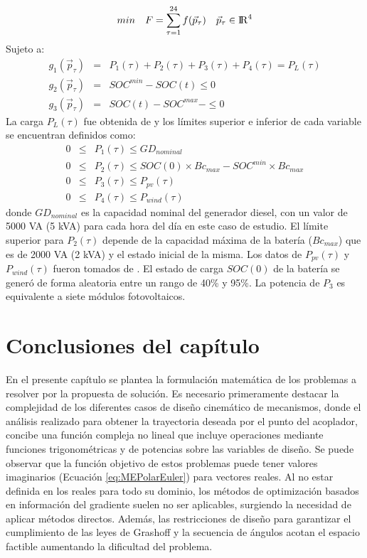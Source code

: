 \begin{equation}\label{eq:MR-FO3}
 min\quad  F=
 \sum_{\tau=1}^{24}f(\vec{p}_\tau) \quad \vec{p}_\tau \in {\rm I\!R}^{4}
 \end{equation}
 Sujeto a:
\begin{eqnarray}\label{eq:Restricciones MR}
g_1(\vec{p}_\tau)&=&P_1(\tau)+P_2(\tau)+P_3(\tau)+P_4(\tau)=P_L(\tau)\\
g_2(\vec{p}_\tau)&=&SOC^{min}-SOC(t)\leq 0 \\
g_3(\vec{p}_\tau)&=&SOC(t)-SOC^{max}-\leq 0 
\end{eqnarray}
La carga $P_L(\tau)$ fue obtenida de \cite{tazvinga2014energy} y los límites superior e inferior de cada variable se encuentran definidos como:
\begin{eqnarray}\label{eq:Restricciones MR3}
0  & \leq & P_1(\tau)   \leq  GD_{nominal} \\
0  & \leq & P_2(\tau)   \leq  SOC(0) \times Bc_{max}-  SOC^{min} \times  Bc_{max}\\
0  & \leq & P_3(\tau)   \leq  P_{pv}( \tau) \\
0  & \leq & P_4(\tau)   \leq  P_{wind}(\tau )  \label{eq:ultima restriccion MR}
\end{eqnarray}
donde $GD_{nominal}$ es la capacidad nominal del generador diesel, con un valor de 5000 VA (5 kVA) para cada hora del día en este caso de estudio. El límite superior para $ P_2(\tau)$ depende de la capacidad máxima de la batería ($Bc_{max}$) que es de 2000 VA (2 kVA) y el estado inicial de la misma. Los datos de $ P_{pv}( \tau)$ y $ P_{wind}(\tau )$  fueron tomados de \cite{Ramabhotla_Economic_dispatch}. El estado de carga $SOC(0)$ de la batería se generó de forma aleatoria entre un rango de 40\% y 95\%. La potencia de $P_3$ es equivalente a siete módulos fotovoltaicos.				
	
						


\section{Conclusiones del capítulo}
En el presente capítulo se plantea la formulación matemática de los problemas a resolver por la propuesta de solución. Es necesario primeramente destacar la complejidad de los diferentes casos de diseño cinemático de mecanismos, donde el análisis realizado para obtener la trayectoria deseada por el punto del acoplador, concibe una función compleja no lineal que incluye operaciones mediante funciones trigonométricas y de potencias sobre las variables de diseño. Se puede observar que la función objetivo de estos problemas puede tener valores imaginarios (Ecuación \ref{eq:MEPolarEuler}) para vectores reales. Al no estar definida en los reales para todo su dominio, los métodos de optimización basados en información del gradiente suelen no ser aplicables, surgiendo la necesidad de aplicar métodos directos. Además, las restricciones de diseño para garantizar el cumplimiento de las leyes de Grashoff y la secuencia de ángulos acotan el espacio factible aumentando la dificultad del problema. 

